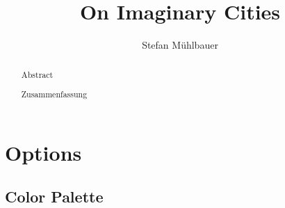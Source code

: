 \documentclass{swsthesis}
\title{On Imaginary Cities}
\author{Stefan Mühlbauer}
\begin{document}
	\frontmatter
	\maketitle
	\tableofcontents
	\clearpage
	
	\begin{abstract}{Abstract}
		\blindtext
	\end{abstract}
	
	\begin{abstract}{Zusammenfassung}
		\blindtext
	\end{abstract}
	
	\begin{acknowledgements}
		\blindtext
	\end{acknowledgements}
	
	\clearpage
	\listoffigures
	\clearpage
	
	\listoftables
	\clearpage
		
	\mainmatter
	\chapter{Options}
	
	\section{Color Palette}
\end{document}
